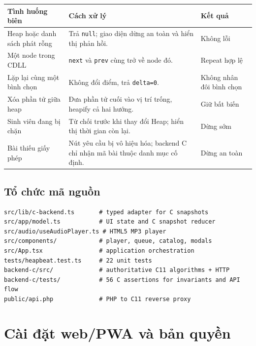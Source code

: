 \documentclass[12pt,a4paper,twoside,openright]{report}
\newcommand{\code}[1]{\texttt{#1}}
\begin{document}
\begin{table}[h]\centering\small
\begin{tabularx}{\textwidth}{@{}p{3.4cm}Xp{2.5cm}@{}}
\toprule
\textbf{Tình huống biên} & \textbf{Cách xử lý} & \textbf{Kết quả}\\
\midrule
Heap hoặc danh sách phát rỗng & Trả \code{null}; giao diện dừng an toàn và hiển thị phản hồi. & Không lỗi\\
Một node trong CDLL & \code{next} và \code{prev} cùng trở về node đó. & Repeat hợp lệ\\
Lặp lại cùng một bình chọn & Không đổi điểm, trả \code{delta=0}. & Không nhân đôi bình chọn\\
Xóa phần tử giữa heap & Đưa phần tử cuối vào vị trí trống, heapify cả hai hướng. & Giữ bất biến\\
Sinh viên đang bị chặn & Từ chối trước khi thay đổi Heap; hiển thị thời gian còn lại. & Dừng sớm\\
Bài thiếu giấy phép & Nút yêu cầu bị vô hiệu hóa; backend C chỉ nhận mã bài thuộc danh mục cố định. & Dừng an toàn\\
\bottomrule
\end{tabularx}
\end{table}

\section{Tổ chức mã nguồn}
\begin{lstlisting}[basicstyle=\ttfamily\scriptsize,aboveskip=2pt,belowskip=2pt]
src/lib/c-backend.ts       # typed adapter for C snapshots
src/app/model.ts           # UI state and C snapshot reducer
src/audio/useAudioPlayer.ts # HTML5 MP3 player
src/components/            # player, queue, catalog, modals
src/App.tsx                # application orchestration
tests/heapbeat.test.ts     # 22 unit tests
backend-c/src/             # authoritative C11 algorithms + HTTP
backend-c/tests/           # 56 C assertions for invariants and API flow
public/api.php             # PHP to C11 reverse proxy
\end{lstlisting}

\newpage

\chapter{Cài đặt web/PWA và bản quyền}
\end{document}
